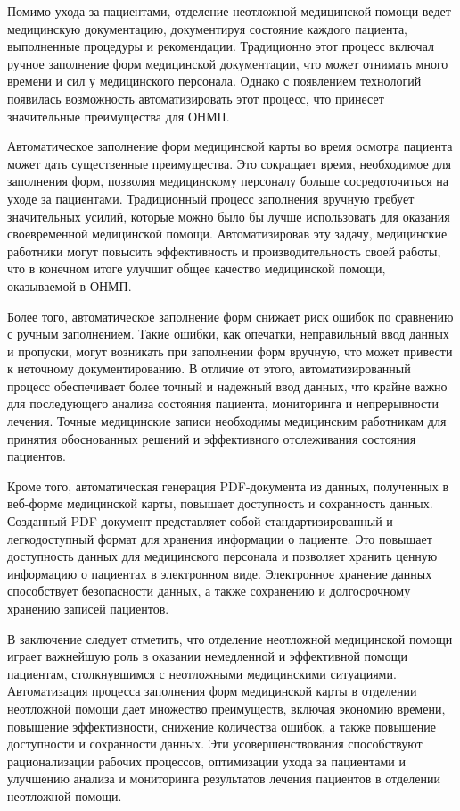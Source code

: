 Помимо ухода за пациентами, отделение неотложной медицинской помощи ведет медицинскую документацию, документируя состояние каждого пациента, выполненные процедуры и рекомендации. Традиционно этот процесс включал ручное заполнение форм медицинской документации, что может отнимать много времени и сил у медицинского персонала. Однако с появлением технологий появилась возможность автоматизировать этот процесс, что принесет значительные преимущества для ОНМП.

Автоматическое заполнение форм медицинской карты во время осмотра пациента может дать существенные преимущества. Это сокращает время, необходимое для заполнения форм, позволяя медицинскому персоналу больше сосредоточиться на уходе за пациентами. Традиционный процесс заполнения вручную требует значительных усилий, которые можно было бы лучше использовать для оказания своевременной медицинской помощи. Автоматизировав эту задачу, медицинские работники могут повысить эффективность и производительность своей работы, что в конечном итоге улучшит общее качество медицинской помощи, оказываемой в ОНМП.

Более того, автоматическое заполнение форм снижает риск ошибок по сравнению с ручным заполнением. Такие ошибки, как опечатки, неправильный ввод данных и пропуски, могут возникать при заполнении форм вручную, что может привести к неточному документированию. В отличие от этого, автоматизированный процесс обеспечивает более точный и надежный ввод данных, что крайне важно для последующего анализа состояния пациента, мониторинга и непрерывности лечения. Точные медицинские записи необходимы медицинским работникам для принятия обоснованных решений и эффективного отслеживания состояния пациентов.

Кроме того, автоматическая генерация PDF-документа из данных, полученных в веб-форме медицинской карты, повышает доступность и сохранность данных. Созданный PDF-документ представляет собой стандартизированный и легкодоступный формат для хранения информации \cite{1} о пациенте. Это повышает доступность данных для медицинского персонала и позволяет хранить ценную информацию о пациентах в электронном виде. Электронное хранение данных способствует безопасности данных, а также сохранению и долгосрочному хранению записей пациентов.

В заключение следует отметить, что отделение неотложной медицинской помощи играет важнейшую роль в оказании немедленной и эффективной помощи пациентам, столкнувшимся с неотложными медицинскими ситуациями. Автоматизация процесса заполнения форм медицинской карты в отделении неотложной помощи дает множество преимуществ, включая экономию времени, повышение эффективности, снижение количества ошибок, а также повышение доступности и сохранности данных. Эти усовершенствования способствуют рационализации рабочих процессов, оптимизации ухода за пациентами и улучшению анализа и мониторинга результатов лечения пациентов в отделении неотложной помощи.



